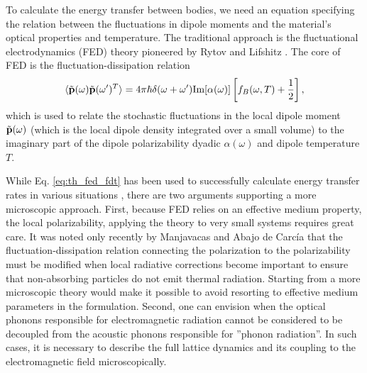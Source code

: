 To calculate the energy transfer between bodies, we need an equation specifying the relation between the fluctuations in dipole moments and the material's optical properties and temperature. The traditional approach is the fluctuational electrodynamics (FED) theory pioneered by Rytov \cite{rytov} and Lifshitz \cite{lifshitz55}. The core of FED is the fluctuation-dissipation relation \cite{novotny,agarwal75_1}
\begin{equation}
 \langle \tilde{\mathbf{p}}(\omega)\tilde{\mathbf{p}}(\omega')^T\rangle = 4\pi \hbar \delta(\omega+\omega')  \textrm{Im}[\alpha(\omega)] \left[f_B(\omega,T)+\frac{1}{2} \right], \label{eq:th_fed_fdt}
\end{equation}
which is used to relate the stochastic fluctuations in the local dipole moment $\tilde{\mathbf{p}}(\omega)$ (which is the local dipole density integrated over a small volume) to the imaginary part of the dipole polarizability dyadic $\alpha(\omega)$ and dipole temperature $T$. 

While Eq. \eqref{eq:th_fed_fdt} has been used to successfully calculate energy transfer rates in various situations \cite{}, there are two arguments supporting a more microscopic approach. First, because FED relies on an effective medium property, the local polarizability, applying the theory to very small systems requires great care. It was noted only recently by Manjavacas and Abajo de Carc\'ia \cite{manjavacas12} that the fluctuation-dissipation relation connecting the polarization to the polarizability must be modified when local radiative corrections become important to ensure that non-absorbing particles do not emit thermal radiation. Starting from a more microscopic theory would make it possible to avoid resorting to effective medium parameters in the formulation. Second, one can envision  when the optical phonons responsible for electromagnetic radiation cannot be considered to be decoupled from the acoustic phonons responsible for ''phonon radiation''. In such cases, it is necessary to describe the full lattice dynamics and its coupling to the electromagnetic field microscopically. 



